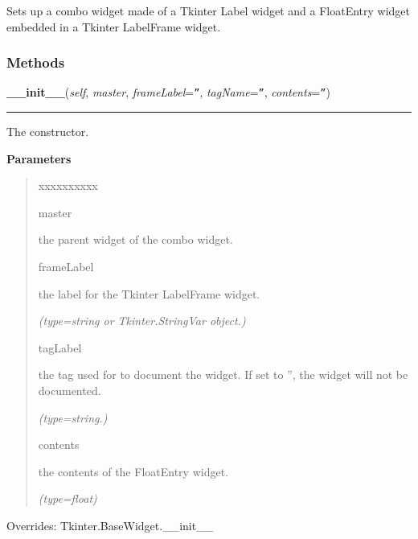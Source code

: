 Sets up a combo widget made of a Tkinter Label widget and a FloatEntry 
widget embedded in a Tkinter LabelFrame widget.



  \subsubsection{Methods}

    \vspace{0.5ex}

\hspace{.8\funcindent}\begin{boxedminipage}{\funcwidth}

    \raggedright \textbf{\_\_init\_\_}(\textit{self}, \textit{master}, \textit{frameLabel}={\tt ''}, \textit{tagName}={\tt ''}, \textit{contents}={\tt ''})

    \vspace{-1.5ex}

    \rule{\textwidth}{0.5\fboxrule}
\setlength{\parskip}{2ex}
    The constructor.

\setlength{\parskip}{1ex}
      \textbf{Parameters}
      \vspace{-1ex}

      \begin{quote}
        \begin{Ventry}{xxxxxxxxxx}

          \item[master]

          the parent widget of the combo widget.

          \item[frameLabel]

          the label for the Tkinter LabelFrame widget.

            {\it (type=string or Tkinter.StringVar object.)}

          \item[tagLabel]

          the tag used for to document the widget. If set to '', the widget
          will not be documented.

            {\it (type=string.)}

          \item[contents]

          the contents of the FloatEntry widget.

            {\it (type=float)}

        \end{Ventry}

      \end{quote}

      Overrides: Tkinter.BaseWidget.\_\_init\_\_

    \end{boxedminipage}

